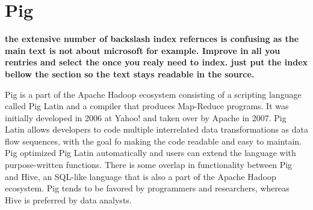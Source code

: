 \section{Pig}

{\bf the extensive number of backslash index refernces is confusing as the main
  text is not about microsoft for example. Improve in all you rentries
and select the once you realy need to index. just put the index bellow
the section so the text stays readable in the source.}

Pig is a part of the Apache Hadoop
ecosystem consisting of a scripting language called Pig
Latin and a compiler that produces
Map-Reduce programs. It was initially developed in
2006 at Yahoo! and taken over by Apache in
2007\cite{hid-sp18-419-die2015datascience}. Pig Latin allows
developers to code multiple interrelated data transformations as data
flow sequences, with the goal fo making the code readable and easy to
maintain. Pig optimized Pig Latin automatically and users can extend
the language with purpose-written
functions\cite{hid-sp18-419-www-pig}. There is some overlap in
functionality between Pig and Hive, an SQL-like
language that is also a part of the Apache Hadoop ecosystem. Pig tends
to be favored by programmers and researchers, whereas Hive is
preferred by data analysts\cite{hid-sp18-419-www-dezyre-pig}.
